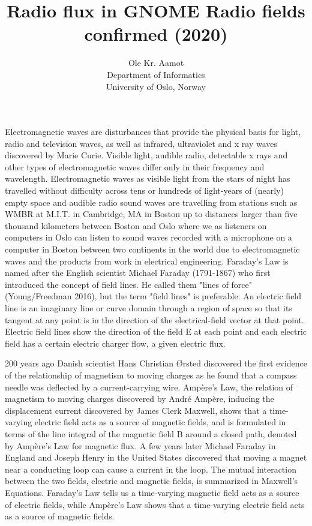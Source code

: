\documentclass[a4paper]{article}
\author{Ole Kr. Aamot\\
  Department of Informatics\\
  University of Oslo, Norway}
\title{Radio flux in GNOME Radio fields confirmed (2020)}
\begin{document}
\maketitle

Electromagnetic waves are disturbances that provide the physical basis for 
light, radio and television waves, as well as infrared, ultraviolet and x 
ray waves discovered by Marie Curie. Visible light, audible radio, 
detectable x rays and other types of electromagnetic waves differ only in 
their frequency and wavelength. Electromagnetic waves as visible light 
from the stars of night has travelled without difficulty across tens or 
hundreds of light-years of (nearly) empty space and audible radio sound 
waves are travelling from stations such as WMBR at M.I.T. in Cambridge, MA 
in Boston up to distances larger than five thousand kilometers between 
Boston and Oslo where we as listeners on computers in Oslo can listen to 
sound waves recorded with a microphone on a computer in Boston between two 
continents in the world due to electromagnetic waves and the products from 
work in electrical engineering. Faraday's Law is named after the English 
scientist Michael Faraday (1791-1867) who first introduced the concept of 
field lines.  He called them "lines of force" (Young/Freedman 2016), but 
the term "field lines" is preferable. An electric field line is an 
imaginary line or curve domain through a region of space so that its 
tangent at any point is in the direction of the electrical-field vector at 
that point. Electric field lines show the direction of the field E at each 
point and each electric field has a certain electric charger flow, a given 
electric flux.

200 years ago Danish scientist Hans Christian \O{}rsted discovered the first 
evidence of the relationship of magnetism to moving 
charges as he found that a compass needle was deflected by a 
current-carrying wire. Amp\`ere's Law, the relation of magnetism to moving 
charges discovered by Andr\'e Amp\`ere, inducing the displacement current 
discovered by James Clerk Maxwell, shows that a time-varying electric 
field acts as a source of magnetic fields, and is formulated in terms of 
the line integral of the magnetic field B around a closed path, denoted by 
Amp\`ere's Law for magnetic flux. A few years later Michael Faraday in 
England and Joseph Henry in the United States discovered that moving a 
magnet near a conducting loop can cause a current in the loop. The mutual 
interaction between the two fields, electric and magnetic fields, is 
summarized in Maxwell's Equations. Faraday's Law tells us a time-varying 
magnetic field acts as a source of electric fields, while Amp\`ere's Law 
shows that a time-varying electric field acts as a source of magnetic 
fields.
\end{document}
